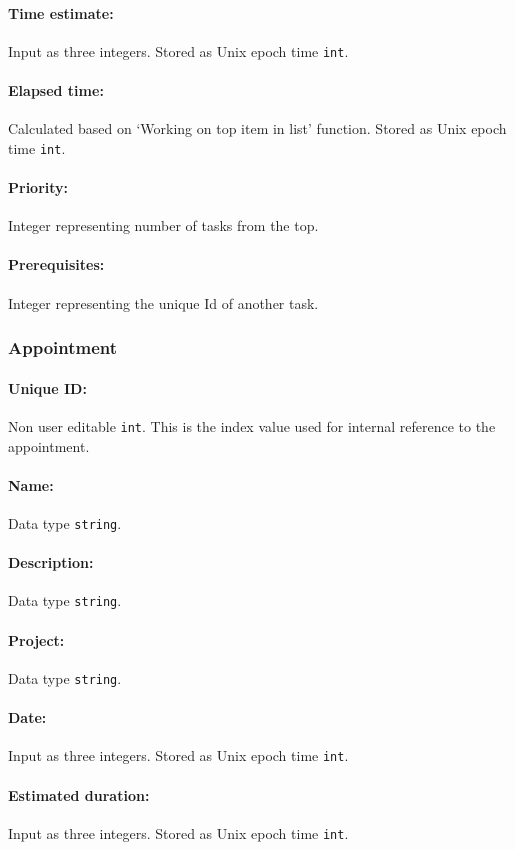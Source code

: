 \documentclass[12pt]{article}
\newcommand{\e}[1] {{\tt #1}}
\begin{document}
\paragraph{Time estimate:} Input as three integers. Stored as Unix epoch time \e{int}.
\paragraph{Elapsed time:} Calculated based on `Working on top item in list' function. Stored as Unix epoch time \e{int}. 
\paragraph{Priority:} Integer representing number of tasks from the top.
\paragraph{Prerequisites:} Integer representing the unique Id of another task.

\subsubsection{Appointment} \label{sec:Appointment}
\paragraph{Unique ID:} Non user editable \e{int}. This is the index value used for internal reference to the appointment. 
\paragraph{Name:} Data type \e{string}.
\paragraph{Description:} Data type \e{string}.
\paragraph{Project:} Data type \e{string}.
\paragraph{Date:} Input as three integers. Stored as Unix epoch time \e{int}.
\paragraph{Estimated duration:} Input as three integers. Stored as Unix epoch time \e{int}.
\end{document}
